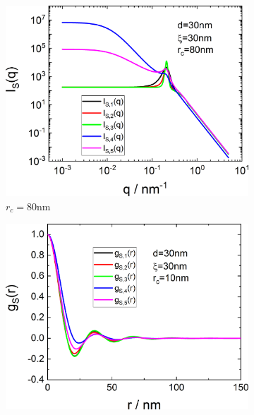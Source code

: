 \begin{figure}[htb]
\begin{subfigure}[b]{.48\textwidth}
\begin{minipage}[b]{1\linewidth}
             \includegraphics[width=1\linewidth]{../images/form_factor/nonparticular/IQCRW_80.png}
   \end{minipage}
   \caption{$r_c=80$nm}
   \label{fig:rm80m}
\end{subfigure}
\hfill
\begin{subfigure}[b]{.48\textwidth}
   \centering
   \begin{minipage}[b]{1\linewidth}
             \includegraphics[width=1\linewidth]{../images/form_factor/nonparticular/gyr0_10.png}\\~\\

\end{minipage}
\end{subfigure}
\end{figure}
